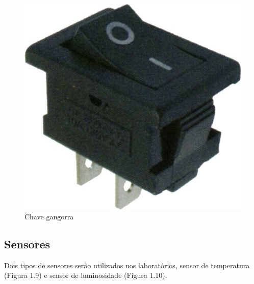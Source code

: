 \begin{figure}[h]
\centering
\includegraphics[scale=0.13]{chapter1/gangorra.jpg}
\caption{Chave gangorra}
\label{fig:8}
\end{figure}

\subsection{Sensores}
\label{subsec:3}
Dois tipos de sensores serão utilizados nos laboratórios, sensor de temperatura (Figura 1.9) e sensor de luminosidade (Figura 1.10).

